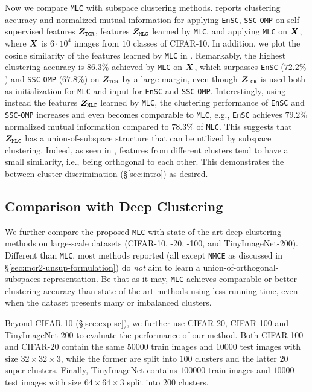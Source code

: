 \documentclass[10pt,twocolumn,letterpaper]{article}
\newcommand{\ours}{MLC}
\newcommand{\mours}{\texttt{\ours}}
\begin{document}
   
   
   Now we compare \mours{} with subspace clustering methods.  reports clustering accuracy and normalized mutual information for applying \texttt{EnSC}, \texttt{SSC}-\texttt{OMP} on self-supervised features ${\bm{Z}}_{\text{\texttt{TCR}}}$, features $\mZ_{\text{\mours}}$ learned by \mours, and applying \mours{} on ${\bm{X}}$, where ${\bm{X}}$ is $6\cdot 10^{4}$ images from $10$ classes of CIFAR-10. In addition, we plot the cosine similarity of the features learned by \mours{} in .
   Remarkably, the highest clustering accuracy is $86.3\%$ achieved by \mours{} on ${\bm{X}}$, which surpasses \texttt{EnSC} ($72.2\%$) and \texttt{SSC}-\texttt{OMP} ($67.8\%$) on ${\bm{Z}}_{\text{\texttt{TCR}}}$ by a large margin, even though ${\bm{Z}}_{\text{\texttt{TCR}}}$ is used both as initialization for \mours{} and input for \texttt{EnSC} and \texttt{SSC}-\texttt{OMP}. Interestingly, using instead the features $\mZ_{\text{\mours}}$ learned by \mours{}, the clustering performance of \texttt{EnSC} and \texttt{SSC}-\texttt{OMP} increases and even becomes comparable to \mours{}, e.g., \texttt{EnSC} achieves $79.2\%$ normalized mutual information compared to $78.3\%$ of \mours{}. This suggests that $\mZ_{\text{\mours}}$ has a union-of-subspace structure that can be utilized by subspace clustering. Indeed, as seen in , features from different clusters tend to have a small similarity, i.e., being orthogonal to each other. This demonstrates the between-cluster discrimination (\S \ref{sec:intro}) as desired. 
  
    
   
   \subsection{Comparison with Deep Clustering} \label{sec:exp-deep}
   We further compare the proposed \mours{} with state-of-the-art deep clustering methods on large-scale datasets (CIFAR-10, -20, -100, and TinyImageNet-200). Different than \mours{}, most methods reported (all except \texttt{NMCE} as discussed in \S \ref{sec:mcr2-unsup-formulation}) do \textit{not} aim to learn a union-of-orthogonal-subspaces representation. Be that as it may, \mours{} achieves comparable or better clustering accuracy than state-of-the-art methods using less running time, even when the dataset presents many or imbalanced clusters.

   Beyond CIFAR-10 (\S \ref{sec:exp-sc}), we further use CIFAR-20, CIFAR-100 and TinyImageNet-200 to evaluate the performance of our method. Both CIFAR-100 and CIFAR-20 contain the same $50000$ train images and $10000$ test images with size $32\times32\times3$, while the former are split into $100$ clusters and the latter $20$ super clusters. Finally, TinyImageNet contains $100000$ train images and $10000$ test images with size $64\times64\times3$ split into $200$ clusters.
\end{document}
